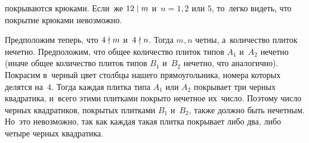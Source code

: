 покрываются крюками.
Если~же $12 \mathrel{\vert} m$ и~$n = 1, 2$ или $5$, то~легко видеть, что покрытие крюками
невозможно.
\par Предположим теперь, что $4 \nmid m$ и~$4 \nmid n$.
Тогда $m,n$ четны, а~количество плиток нечетно.
Предположим, что общее количество плиток типов $A_1$ и~$A_2$ нечетно (иначе
общее количество плиток типов $B_1$ и~$B_2$ нечетно, что аналогично).
Покрасим в~черный цвет столбцы нашего прямоугольника, номера которых делятся
на~4.
Тогда каждая плитка типа $A_1$ или $A_2$ покрывает три черных квадратика,
и~всего этими плитками покрыто нечетное их~число.
Поэтому число черных квадратиков, покрытых плитками $B_1$ и~$B_2$, также должно
быть нечетным.
Но~это невозможно, так как каждая такая плитка покрывает либо два, либо четыре
черных квадратика.
\fi %

\endgroup %

\endgroup %

